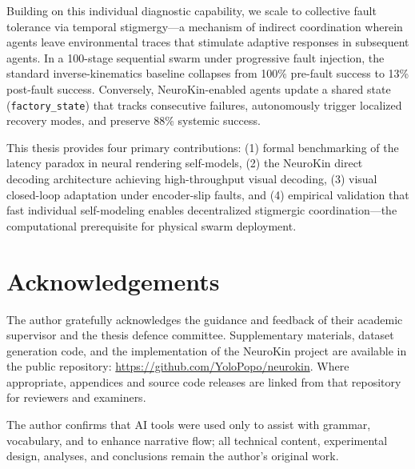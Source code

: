 \documentclass[12pt,a4paper,oneside]{report}
\begin{document}
Building on this individual diagnostic capability, we scale to collective fault tolerance via temporal stigmergy---a mechanism of indirect coordination wherein agents leave environmental traces that stimulate adaptive responses in subsequent agents. In a 100-stage sequential swarm under progressive fault injection, the standard inverse-kinematics baseline collapses from 100\% pre-fault success to 13\% post-fault success. Conversely, NeuroKin-enabled agents update a shared state (\texttt{factory\_state}) that tracks consecutive failures, autonomously trigger localized recovery modes, and preserve 88\% systemic success.

This thesis provides four primary contributions: (1) formal benchmarking of the latency paradox in neural rendering self-models, (2) the NeuroKin direct decoding architecture achieving high-throughput visual decoding, (3) visual closed-loop adaptation under encoder-slip faults, and (4) empirical validation that fast individual self-modeling enables decentralized stigmergic coordination---the computational prerequisite for physical swarm deployment.
\clearpage

\chapter*{Acknowledgements}

The author gratefully acknowledges the guidance and feedback of their academic supervisor and the thesis defence committee. Supplementary materials, dataset generation code, and the implementation of the NeuroKin project are available in the public repository: \url{https://github.com/YoloPopo/neurokin}. Where appropriate, appendices and source code releases are linked from that repository for reviewers and examiners.

The author confirms that AI tools were used only to assist with grammar, vocabulary, and to enhance narrative flow; all technical content, experimental design, analyses, and conclusions remain the author's original work.
\clearpage

\tableofcontents

\clearpage

\listoffigures

\clearpage

\listoftables

\clearpage
\end{document}
